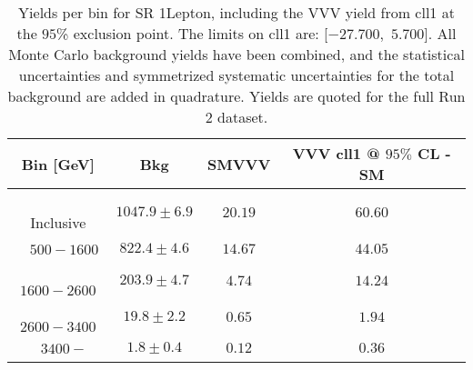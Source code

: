 \begin{table}[!htbp]
    \small
    \center
    \begin{tabular}{c||c|c|c}
    Bin [GeV] & Bkg & SMVVV & \pbox{20cm}{VVV \\ cll1 @ $95\%$ CL - SM \\ }\\
    \hline
    \pbox{20cm}{ ~ \\Inclusive\\ } & $1047.9 \pm 6.9$ & $20.19$ & $60.60$\\
    \hline
    \pbox{20cm}{ ~ \\$500-1600$\\ } & $822.4 \pm 4.6$ & $14.67$ & $44.05$\\
    \hline
    \pbox{20cm}{ ~ \\$1600-2600$\\ } & $203.9 \pm 4.7$ & $4.74$ & $14.24$\\
    \hline
    \pbox{20cm}{ ~ \\$2600-3400$\\ } & $19.8 \pm 2.2$ & $0.65$ & $1.94$\\
    \hline
    \pbox{20cm}{ ~ \\$3400-$\\ } & $1.8 \pm 0.4$ & $0.12$ & $0.36$\\
\end{tabular}
    \caption{Yields per bin for SR 1Lepton, including the VVV yield from cll1 at the $95$\% exclusion point. The limits on cll1 are: [$-27.700$,~$5.700$]. All Monte Carlo background yields have been combined, and the statistical uncertainties and symmetrized systematic uncertainties for the total background are added in quadrature. Yields are quoted for the full Run 2 dataset.}
    \label{tab:1Lepton$binssignal}
\end{table}
